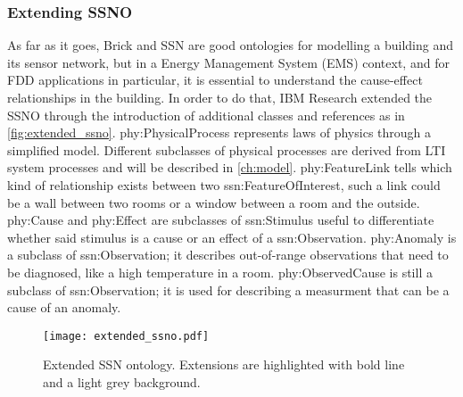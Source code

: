 \subsubsection{Extending SSNO} \label{ssubsec:extended_ssno}
As far as it goes, Brick and SSN are good ontologies for modelling a building and its sensor network, but in a Energy Management System (EMS) context, and for FDD applications in particular, it is essential to understand the cause-effect relationships in the building. In order to do that, IBM Research extended the SSNO through the introduction of additional classes and references as in \autoref{fig:extended_ssno}. phy:PhysicalProcess represents laws of physics through a simplified model. Different subclasses of physical processes are derived from LTI system processes and will be described in \autoref{ch:model}.
phy:FeatureLink tells which kind of relationship exists between two ssn:FeatureOfInterest, such a link could be a wall between two rooms or a window between a room and the outside. phy:Cause and phy:Effect are subclasses of ssn:Stimulus useful to differentiate whether said stimulus is a cause or an effect of a ssn:Observation. phy:Anomaly is a subclass of ssn:Observation; it describes out-of-range observations that need to be diagnosed, like a high temperature in a room. phy:ObservedCause is still a subclass of ssn:Observation; it is used for describing a measurment that can be a cause of an anomaly.

\begin{figure}
  \texttt{[image: extended\_ssno.pdf]}
  \caption{Extended SSN ontology. Extensions are highlighted with bold line and a light grey background.}
  \label{fig:extended_ssno}
\end{figure}
